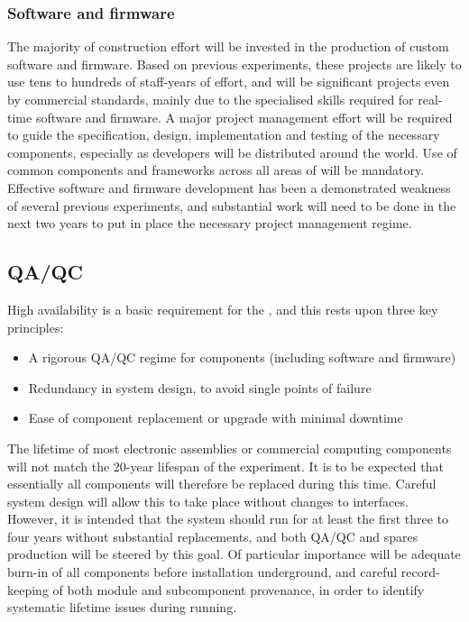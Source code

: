 \subsubsection{Software and firmware}

The majority of  construction effort will be invested in the production of custom software and firmware. Based on previous experiments, these projects are likely to use tens to hundreds of staff-years of effort, and will be significant projects even by commercial standards, mainly due to the specialised skills required for real-time software and firmware. A major project management effort will be required to guide the specification, design, implementation and testing of the necessary components, especially as developers will be distributed around the world. Use of common components and frameworks across all areas of  will be mandatory. Effective  software and firmware development has been a demonstrated weakness of several previous experiments, and substantial work will need to be done in the next two years to put in place the necessary project management regime.

\subsection{QA/QC}

High availability is a basic requirement for the , and this rests upon three key principles:

\begin{itemize}
	\item A rigorous QA/QC regime for components (including software and firmware)
	\item Redundancy in system design, to avoid single points of failure
	\item Ease of component replacement or upgrade with minimal downtime
\end{itemize}

The lifetime of most electronic assemblies or commercial computing components will not match the 20-year lifespan of the experiment. It is to be expected that essentially all components will therefore be replaced during this time. Careful system design will allow this to take place without changes to interfaces. However, it is intended that the system should run for at least the first three to four years without substantial replacements, and both QA/QC and spares production will be steered by this goal. Of particular importance will be adequate burn-in of all components before installation underground, and careful record-keeping of both module and subcomponent provenance, in order to identify systematic lifetime issues during running.

